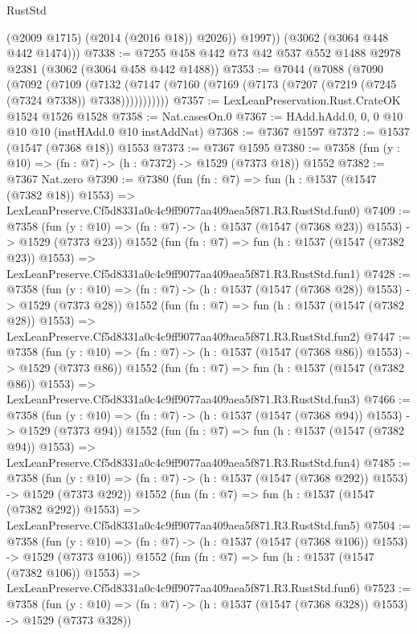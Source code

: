 \begin{lexlean}{RustStd}
\begin{coremodule}
              (@2009 @1715)
              (@2014 (@2016 @18))
              @2026))
          @1997))
      (@3062 (@3064 @448 @442 @1474)))
@7338 := @7255 @458 @442 @73 @42 @537 @552 @1488 @2978 @2381 (@3062 (@3064 @458 @442 @1488))
@7353 := @7044
    (@7088
      (@7090
        (@7092
          (@7109
            (@7132 (@7147 (@7160 (@7169 (@7173 (@7207 (@7219 (@7245 (@7324 @7338)) @7338)))))))))))
@7357 := LexLeanPreservation.Rust.CrateOK @1524 @1526 @1528
@7358 := Nat.casesOn.{0}
@7367 := HAdd.hAdd.{0, 0, 0} @10 @10 @10 (instHAdd.{0} @10 instAddNat)
@7368 := @7367 @1597
@7372 := @1537 (@1547 (@7368 @18)) @1553
@7373 := @7367 @1595
@7380 := @7358 (fun (y : @10) => (fn : @7) -> (h : @7372) -> @1529 (@7373 @18)) @1552
@7382 := @7367 Nat.zero
@7390 := @7380
    (fun (fn : @7) =>
    fun (h : @1537 (@1547 (@7382 @18)) @1553) =>
    LexLeanPreserve.Cf5d8331a0c4c9ff9077aa409aea5f871.R3.RustStd.fun0)
@7409 := @7358
    (fun (y : @10) => (fn : @7) -> (h : @1537 (@1547 (@7368 @23)) @1553) -> @1529 (@7373 @23))
    @1552
    (fun (fn : @7) =>
    fun (h : @1537 (@1547 (@7382 @23)) @1553) =>
    LexLeanPreserve.Cf5d8331a0c4c9ff9077aa409aea5f871.R3.RustStd.fun1)
@7428 := @7358
    (fun (y : @10) => (fn : @7) -> (h : @1537 (@1547 (@7368 @28)) @1553) -> @1529 (@7373 @28))
    @1552
    (fun (fn : @7) =>
    fun (h : @1537 (@1547 (@7382 @28)) @1553) =>
    LexLeanPreserve.Cf5d8331a0c4c9ff9077aa409aea5f871.R3.RustStd.fun2)
@7447 := @7358
    (fun (y : @10) => (fn : @7) -> (h : @1537 (@1547 (@7368 @86)) @1553) -> @1529 (@7373 @86))
    @1552
    (fun (fn : @7) =>
    fun (h : @1537 (@1547 (@7382 @86)) @1553) =>
    LexLeanPreserve.Cf5d8331a0c4c9ff9077aa409aea5f871.R3.RustStd.fun3)
@7466 := @7358
    (fun (y : @10) => (fn : @7) -> (h : @1537 (@1547 (@7368 @94)) @1553) -> @1529 (@7373 @94))
    @1552
    (fun (fn : @7) =>
    fun (h : @1537 (@1547 (@7382 @94)) @1553) =>
    LexLeanPreserve.Cf5d8331a0c4c9ff9077aa409aea5f871.R3.RustStd.fun4)
@7485 := @7358
    (fun (y : @10) => (fn : @7) -> (h : @1537 (@1547 (@7368 @292)) @1553) -> @1529 (@7373 @292))
    @1552
    (fun (fn : @7) =>
    fun (h : @1537 (@1547 (@7382 @292)) @1553) =>
    LexLeanPreserve.Cf5d8331a0c4c9ff9077aa409aea5f871.R3.RustStd.fun5)
@7504 := @7358
    (fun (y : @10) => (fn : @7) -> (h : @1537 (@1547 (@7368 @106)) @1553) -> @1529 (@7373 @106))
    @1552
    (fun (fn : @7) =>
    fun (h : @1537 (@1547 (@7382 @106)) @1553) =>
    LexLeanPreserve.Cf5d8331a0c4c9ff9077aa409aea5f871.R3.RustStd.fun6)
@7523 := @7358
    (fun (y : @10) => (fn : @7) -> (h : @1537 (@1547 (@7368 @328)) @1553) -> @1529 (@7373 @328))

\end{coremodule}
\end{lexlean}
